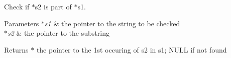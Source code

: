 Check if $\ast$s2 is part of $\ast$s1. 


\begin{DoxyParams}{Parameters}
{\em $\ast$s1} & the pointer to the string to be checked \\
\hline
{\em $\ast$s2} & the pointer to the substring \\
\hline
\end{DoxyParams}
\begin{DoxyReturn}{Returns}
$\ast$ the pointer to the 1st occuring of s2 in s1; N\+U\+LL if not found 
\end{DoxyReturn}
